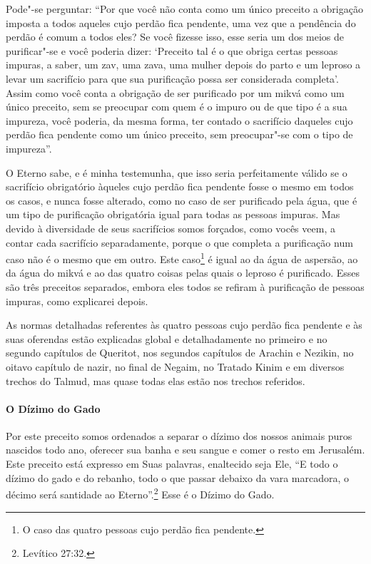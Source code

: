 \begin{multicols}{2}
Pode"-se perguntar: ``Por que você não conta como um único preceito a
obrigação imposta a todos aqueles cujo perdão fica pendente, uma vez que
a pendência do perdão é comum a todos eles? Se você fizesse isso, esse
seria um dos meios de purificar"-se e você poderia dizer: `Preceito tal é
o que obriga certas pessoas impuras, a saber, um zav\starr, uma
zava\starr, uma mulher depois do parto e um leproso a levar um
sacrifício para que sua purificação possa ser considerada completa'.
Assim como você conta a obrigação de ser purificado por um mikvá\starr{} como
um único preceito, sem se preocupar com quem é o impuro ou de que tipo é
a sua impureza, você poderia, da mesma forma, ter contado o sacrifício daqueles cujo perdão fica pendente como um único
preceito, sem preocupar"-se com o tipo de impureza''.

O Eterno sabe, e é minha testemunha, que isso seria perfeitamente válido
se o sacrifício obrigatório àqueles cujo perdão fica pendente fosse o
mesmo em todos os casos, e nunca fosse alterado, como no caso de ser
purificado pela água, que é um tipo de purificação obrigatória igual
para todas as pessoas impuras. Mas devido à diversidade de seus
sacrifícios somos forçados, como vocês veem, a contar cada sacrifício
separadamente, porque o que completa a purificação num caso não é o
mesmo que em outro. Este caso\footnote{O caso das quatro pessoas cujo perdão fica pendente.} é igual ao da água
de aspersão, ao da água do mikvá\starr{} e ao das quatro coisas pelas quais
o leproso é purificado. Esses são três preceitos separados, embora eles
todos se refiram à purificação de pessoas impuras, como explicarei
depois.

As normas detalhadas referentes às quatro pessoas cujo perdão fica
pendente e às suas oferendas estão explicadas global e detalhadamente no
primeiro e no segundo capítulos de Queritot\starr, nos segundos capítulos de
Arachin\star{} e Nezikin\starr, no oitavo capítulo de nazir\starr, no final de Negaim\starr, no
Tratado Kinim\starr{} e em diversos trechos do Talmud\starr, mas quase todas elas
estão nos trechos referidos.

\paragraph{O Dízimo do Gado}

Por este preceito somos ordenados a separar o dízimo dos nossos animais
puros nascidos todo ano, oferecer sua banha e seu sangue e comer o resto
em Jerusalém. Este preceito está expresso em Suas palavras, enaltecido
seja Ele, ``E todo o dízimo do gado e do rebanho, todo o que passar
debaixo da vara marcadora, o décimo será santidade ao Eterno''.\footnote{Levítico 27:32.} Esse é o Dízimo do Gado.


\end{multicols}
